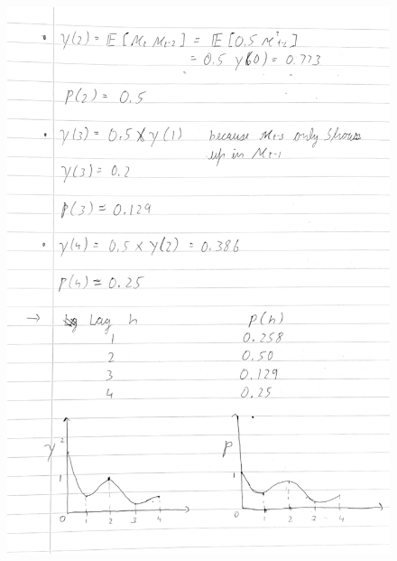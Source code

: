 \documentclass[a4paper,11pt]{article}
\begin{document}
    \begin{figure}[H]
        \centering
        \includegraphics[width=1\textwidth]{ha-1_files/2-2.png}
        \label{fig:1-2}
    \end{figure}
\end{document}
